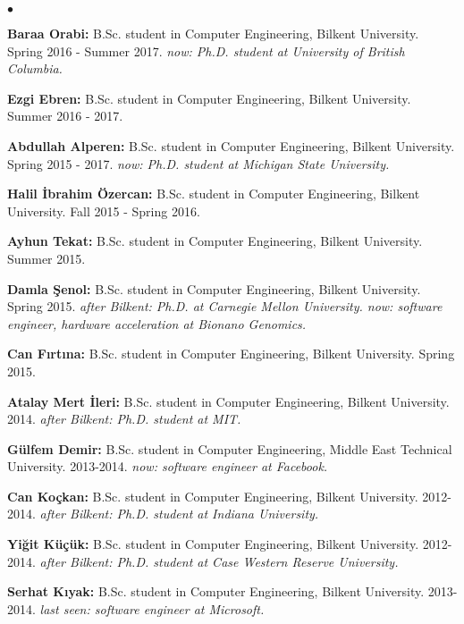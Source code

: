 \documentclass[margin,line]{res}
\newenvironment{list2}{
  \begin{list}{$\bullet$}{%
      \setlength{\itemsep}{0.1cm}
      \setlength{\parsep}{0in} \setlength{\parskip}{0in}
      \setlength{\topsep}{0in} \setlength{\partopsep}{0in} 
      \setlength{\leftmargin}{0.2in}}}{\end{list}}
\begin{document}
\begin{resume}
\begin{list2}
\clearpage

\item {\bf Baraa Orabi:} B.Sc. student in Computer Engineering,  Bilkent University. Spring 2016 - Summer 2017. {\it now: Ph.D. student at  University of British Columbia.}
\item {\bf Ezgi Ebren:} B.Sc. student in Computer Engineering,  Bilkent University. Summer 2016 - 2017.

\item {\bf Abdullah Alperen:} B.Sc. student in Computer Engineering,  Bilkent University. Spring 2015 - 2017. {\it now: Ph.D. student at Michigan State University.}
\item {\bf Halil İbrahim Özercan:} B.Sc. student in Computer Engineering,  Bilkent University. Fall 2015 - Spring 2016. 
\item {\bf Ayhun Tekat:} B.Sc. student in Computer Engineering,  Bilkent University. Summer 2015. 


\item {\bf Damla Şenol:} B.Sc. student in Computer Engineering,  Bilkent University. Spring 2015. {\it after Bilkent: Ph.D. at Carnegie Mellon University. now: software engineer, hardware acceleration at Bionano Genomics.}
\item {\bf Can Fırtına:} B.Sc. student in Computer Engineering,  Bilkent University. Spring 2015. 
\item {\bf Atalay Mert İleri:} B.Sc. student in Computer Engineering, Bilkent University. 2014. {\it after Bilkent: Ph.D. student at MIT.}
\item {\bf Gülfem Demir:} B.Sc. student in Computer Engineering,  Middle East Technical University. 2013-2014. {\it now: software engineer at Facebook.}

\item {\bf Can Koçkan:} B.Sc. student in Computer Engineering,  Bilkent University.  2012-2014. {\it after Bilkent: Ph.D. student at Indiana University.}
\item {\bf Yiğit Küçük:} B.Sc. student in Computer Engineering,  Bilkent University. 2012-2014. {\it after Bilkent: Ph.D. student at Case Western Reserve University.}
\item {\bf Serhat Kıyak:} B.Sc. student in Computer Engineering,  Bilkent University. 2013-2014. {\it last seen: software engineer at Microsoft.}
\end{list2}


\vspace*{-.4cm}

\end{resume}
\end{document}

